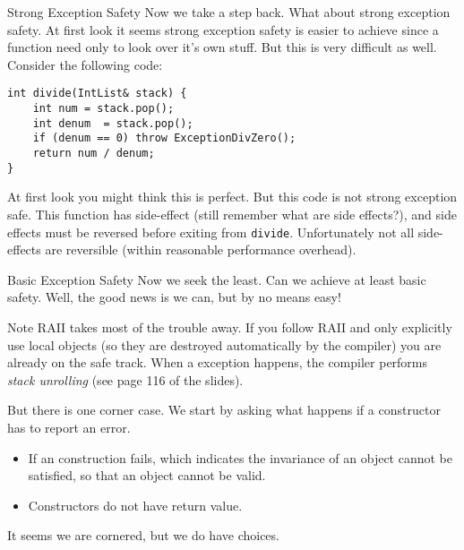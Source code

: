 \begin{frame}[fragile]{Strong Exception Safety}
Now we take a step back. What about strong exception safety. At first look it seems strong exception safety is easier to achieve since a function need only to look over it's own stuff. But this is very difficult as well. Consider the following code:

\begin{verbatim}
int divide(IntList& stack) {
    int num = stack.pop();
    int denum  = stack.pop();
    if (denum == 0) throw ExceptionDivZero();
    return num / denum;
}
\end{verbatim}

At first look you might think this is perfect. But this code is not strong exception safe. This function has side-effect (still remember what are side effects?), and side effects must be reversed before exiting from \texttt{divide}. Unfortunately not all side-effects are reversible (within reasonable performance overhead).
\end{frame}

\begin{frame}{Basic Exception Safety}
Now we seek the least. Can we achieve at least basic safety. Well, the good news is we can, but by no means easy! 

Note RAII takes most of the trouble away. If you follow RAII and only explicitly use local objects (so they are destroyed automatically by the compiler) you are already on the safe track. When a exception happens, the compiler performs \textit{stack unrolling} (see page 116 of the slides).

But there is one corner case. We start by asking what happens if a constructor has to report an error.
\begin{itemize}
	\item If an construction fails, which indicates the invariance of an object cannot be satisfied, so that an object cannot be valid.
	\item Constructors do not have return value.
\end{itemize}

It seems we are cornered, but we do have choices.
\end{frame}

